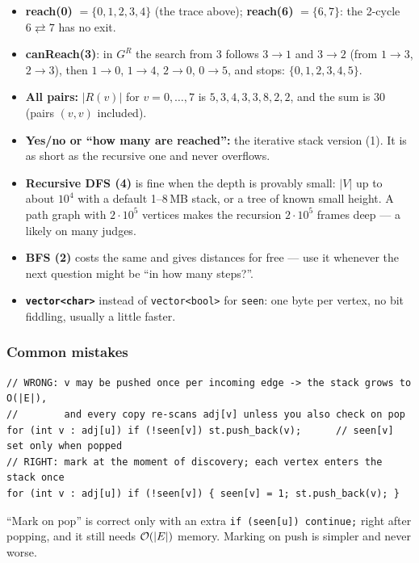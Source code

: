 \begin{insightbox}
\begin{itemize}[leftmargin=*]
    \item \textbf{reach(0)} $=\{0,1,2,3,4\}$ (the trace above); \textbf{reach(6)} $= \{6, 7\}$: the 2-cycle $6 \rightleftarrows 7$ has no exit.
    \item \textbf{canReach(3)}: in $G^R$ the search from 3 follows $3 \to 1$ and $3 \to 2$ (from $1{\to}3$, $2{\to}3$), then $1 \to 0$, $1 \to 4$, $2 \to 0$, $0 \to 5$, and stops: $\{0,1,2,3,4,5\}$.
    \item \textbf{All pairs:} $|R(v)|$ for $v = 0, \dots, 7$ is $5, 3, 4, 3, 3, 8, 2, 2$, and the sum is $30$ (pairs $(v,v)$ included).
\end{itemize}
\end{insightbox}

\begin{tricksbox}
\begin{itemize}[leftmargin=*]
    \item \textbf{Yes/no or ``how many are reached'':} the iterative stack version (1). It is as short as the recursive one and never overflows.
    \item \textbf{Recursive DFS (4)} is fine when the depth is provably small: $|V|$ up to about $10^4$ with a default 1--8\,MB stack, or a tree of known small height. A path graph with $2\cdot 10^5$ vertices makes the recursion $2\cdot10^5$ frames deep --- a likely \stackoverflow{} on many judges.
    \item \textbf{BFS (2)} costs the same and gives distances for free --- use it whenever the next question might be ``in how many steps?''.
    \item \textbf{\texttt{vector<char>}} instead of \texttt{vector<bool>} for \texttt{seen}: one byte per vertex, no bit fiddling, usually a little faster.
\end{itemize}
\end{tricksbox}

\subsubsection*{Common mistakes}

\begin{warningbox}
\begin{lstlisting}[style=snippet]
// WRONG: v may be pushed once per incoming edge -> the stack grows to O(|E|),
//        and every copy re-scans adj[v] unless you also check on pop
for (int v : adj[u]) if (!seen[v]) st.push_back(v);      // seen[v] set only when popped
// RIGHT: mark at the moment of discovery; each vertex enters the stack once
for (int v : adj[u]) if (!seen[v]) { seen[v] = 1; st.push_back(v); }
\end{lstlisting}
``Mark on pop'' is correct only with an extra \texttt{if (seen[u]) continue;} right after popping, and it still needs $\mathcal{O}(|E|)$ memory. Marking on push is simpler and never worse.
\end{warningbox}

